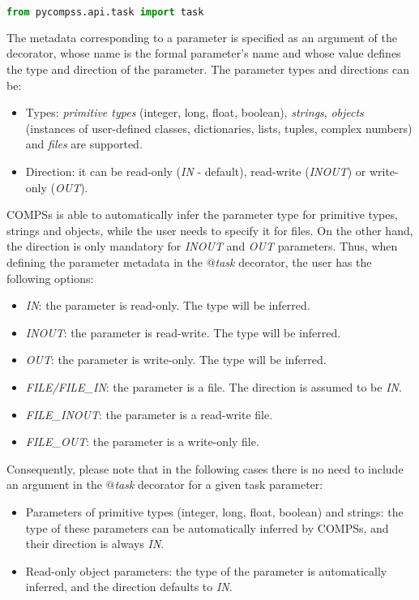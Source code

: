 \begin{lstlisting}[language=python]
from pycompss.api.task import task
\end{lstlisting}

The metadata corresponding to a parameter is specified as an argument of the decorator, whose name is 
the formal parameter's name and whose value defines the type and direction of the parameter. 
The parameter types and directions can be:

\begin{itemize}
 \item Types: {\it primitive types} (integer, long, float, boolean), {\it strings}, {\it objects} (instances of user-defined classes, dictionaries, lists, tuples, complex numbers) and {\it files} are supported.
 \item Direction: it can be read-only ({\it IN} - default), read-write ({\it INOUT}) or write-only ({\it OUT}).
\end{itemize}

COMPSs is able to automatically infer the parameter type for primitive types, strings and objects, 
while the user needs to specify it for files. On the other hand, the direction is only mandatory for 
{\it INOUT} and {\it OUT} parameters. Thus, when defining the parameter metadata in the {\it $@$task} 
decorator, the user has the following options:

\begin{itemize}
 \item {\it IN}: the parameter is read-only. The type will be inferred.
 \item {\it INOUT}: the parameter is read-write. The type will be inferred.
 \item {\it OUT}: the parameter is write-only. The type will be inferred.
 \item {\it FILE/FILE\_IN}: the parameter is a file. The direction is assumed to be {\it IN}.
 \item {\it FILE\_INOUT}: the parameter is a read-write file.
 \item {\it FILE\_OUT}: the parameter is a write-only file.
\end{itemize}

Consequently, please note that in the following cases there is no need to include an argument in 
the {\it $@$task} decorator for a given task parameter:

\begin{itemize}
 \item Parameters of primitive types (integer, long, float, boolean) and strings: the type of these 
       parameters can be automatically inferred by COMPSs, and their direction is always {\it IN}.
 \item Read-only object parameters: the type of the parameter is automatically inferred, and the 
       direction defaults to {\it IN}.
\end{itemize}

